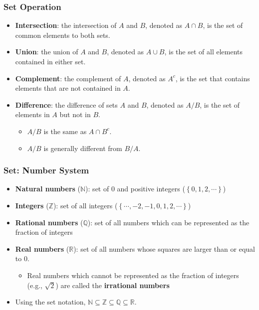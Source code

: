 \documentclass[pdflatex, 12pt]{beamer}
\newcommand{\R}{\mathbb{R}}
\newcommand{\Q}{\mathbb{Q}}
\newcommand{\Z}{\mathbb{Z}}
\newcommand{\N}{\mathbb{N}}
\begin{document}
\begin{frame}
\frametitle{Set Operation}
\begin{itemize}
\item \textbf{Intersection}: the intersection of $A$ and $B$, denoted as $A \cap B$, is the set of common elements to both sets. 
\vspace{0.4cm}
\item \textbf{Union}: the union of $A$ and $B$, denoted as $A \cup B$, is the set of all elements contained in either set.
\vspace{0.4cm}
\item \textbf{Complement}: the complement of $A$, denoted as $A^{c}$, is the set that contains elements that are not contained in $A$.
\vspace{0.4cm}
\item \textbf{Difference}: the difference of sets $A$ and $B$, denoted as $A/B$, is the set of elements in $A$ but not in $B$.
 \begin{itemize}
 \item $A/B$ is the same as $A \cap B^{c}$.
 \item $A/B$ is generally different from $B/A$.
 \end{itemize} 
\end{itemize}
\end{frame}

\begin{frame}
\frametitle{Set: Number System}
\begin{itemize}
\item \textbf{Natural numbers} ($\N$): set of 0 and positive integers ($\left\{0, 1, 2, \cdots \right\}$) 
\vspace{0.4cm}
\item \textbf{Integers} ($\Z$): set of all integers ($\left\{\cdots, -2, -1, 0, 1, 2, \cdots \right\}$)
\vspace{0.4cm}
\item \textbf{Rational numbers} ($\Q$): set of all numbers which can be represented as the fraction of integers
\vspace{0.4cm}
\item \textbf{Real numbers} ($\R$): set of all numbers whose squares are larger than or equal to 0.
 \begin{itemize}
 \item Real numbers which cannot be represented as the fraction of integers (e.g., $\sqrt{2}$) are called the \textbf{irrational numbers}
 \end{itemize} 
\vspace{0.4cm}
\item Using the set notation, $\N \subseteq \Z \subseteq \Q \subseteq \R$.
\end{itemize}
\end{frame}
\end{document}
